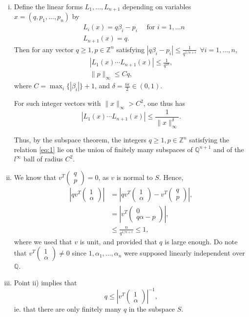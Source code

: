 \documentclass[12pt,a4paper]{article}
\theoremstyle{plain}
\theoremstyle{definition}
\def \Q {\mathbb Q}
\def \Z {\mathbb Z}
\newcommand{\qp}{\begin{pmatrix} q \\ p \end{pmatrix}}
\newcommand{\onealpha}{\begin{pmatrix}1 \\ \alpha \end{pmatrix}}
\begin{document}
{
	\begin{enumerate}[i)]
		\item
		Define the linear forms $L_1, \dots, L_{n+1}$ depending on variables $x = (q, p_1, \dots, p_n)$ by
			\begin{align*}
			        & L_i(x) = q \beta_i - p_i \quad \text{ for } i = 1, \hdots n \\
			        & L_{n+1}(x) = q.
			\end{align*}
		Then for any vector $q \geq 1, p \in \Z^n$ satisfying $| q \beta_i - p_i | \leq \frac{1}{q^{1/n + \epsilon}}  \ \ \forall i=1, \dots, n$, 
			    \begin{gather*}
			    | L_1(x) \cdots L_{n+1}(x) | \leq \frac{1}{q^{2 \delta}}, \\
				\| p \|_\infty \leq C q,
			    \end{gather*}
		where $C = \max_i \{ | \beta_i |\}+1$, and  $\delta = \frac{n \epsilon}2 \in (0, 1)$.
	
		For such integer vectors with $\| x \|_\infty > C^{2}$, one thus has
			\[ | L_1(x) \cdots L_{n+1}(x) | \leq \frac{1}{\| x  \|_\infty^\delta}. \] 
	    
		Thus, by the subspace theorem, the integers $q \geq 1, p \in \Z^n$ satisfying the relation \eqref{eq:1} lie on the union of finitely many subspaces of $\Q^{n+1}$ and of the $l^\infty$ ball of radius $C^2$.

		\item 
		We know that $v^T \qp = 0$, as $v$ is normal to $S$.
		Hence,
			\begin{align*}
				| q v^T \onealpha | &= | q v^T \onealpha - v^T \qp |, \\
								& = | v^T \begin{pmatrix} 0 \\ q\alpha - p \end{pmatrix} |, \\
								&\leq\frac{n}{q^{1/n + \epsilon}} \leq 1, 
			\end{align*}
		where we used that $v$ is unit, and provided that $q$ is large enough.
		Do note that $v^T \onealpha \neq 0$ since $1, \alpha_1, \dots, \alpha_n$ were supposed linearly independent over $\Q$.

		\item 
		Point ii) implies that 
			\[ q \leq \left| v^T \onealpha \right|^{-1}, \]
		ie. that there are only finitely many $q$ in the subspace $S$.
	\end{enumerate}
}
\end{document}
